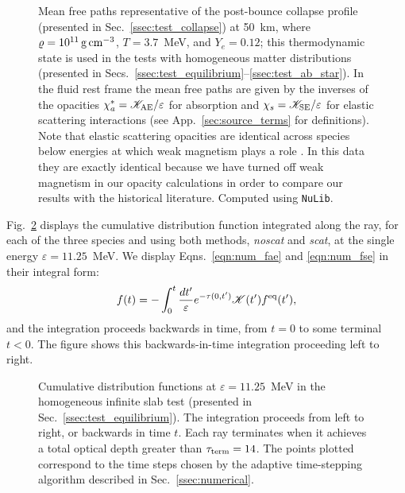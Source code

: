 \documentclass[aps,floatfix,prd,superscriptaddress,twocolumn]{revtex4-1}
\begin{document}
\begin{figure}
  \resizebox{\columnwidth}{!}{}
  \caption{Mean free paths
    representative of the post-bounce collapse profile (presented in
    Sec.~\ref{ssec:test_collapse}) at
    50~km, where $\varrho=10^{11}\,{\rm g}\,{\rm cm}^{-3}$,
    $T=3.7$~MeV, and $Y_e=0.12$; this thermodynamic state is used in
    the tests with homogeneous matter distributions
    (presented in Secs.~\ref{ssec:test_equilibrium}--\ref{ssec:test_ab_star}).
    In the fluid rest frame the mean free paths are given by the inverses of the opacities
    $\chi^*_a=\mathscr{K}_{\rm AE}/\varepsilon$ for absorption and
    $\chi_s=\mathscr{K}_{\rm SE}/\varepsilon$ for elastic scattering interactions
    (see App.~\ref{sec:source_terms} for definitions).
    Note that elastic scattering opacities are identical across species
    below energies at which weak magnetism plays a role \cite{horo2002-weak_mag}.
    In this data they are exactly identical
    because we have turned off weak magnetism in our opacity calculations
    in order to compare our results with the historical literature.
    Computed using \lstinline{NuLib}.
  }
  \label{fig:mfps-50km}
\end{figure}

Fig.~\ref{fig:cumulative_f_homogeneous} displays the cumulative distribution
function integrated along the ray, for each of the three species and using
both methods, \emph{noscat} and \emph{scat}, at the single energy
$\varepsilon=11.25$~MeV. We display
Eqns.~\ref{eqn:num_fae} and \ref{eqn:num_fse} in their integral form:
\begin{equation}
  \label{eqn:cumulative_f}
  f(t)
  = - \int_{0}^t \frac{dt'}{\varepsilon}e^{-\tau(0,t')}
  \mathscr{K}(t')f^{\rm eq}(t'),
\end{equation}
and the integration proceeds backwards in time, from $t=0$
to some terminal $t<0$.
The figure shows this backwards-in-time integration proceeding left to right.

\begin{figure}
  \resizebox{\columnwidth}{!}{}
  \caption{Cumulative distribution functions at $\varepsilon=11.25$~MeV
    in the homogeneous infinite slab test
    (presented in Sec.~\ref{ssec:test_equilibrium}).
    The integration proceeds from left to right, or backwards in time $t$.
    Each ray terminates when it achieves a total optical depth
    greater than $\tau_{\rm term}=14$.
    The points plotted correspond to the time steps chosen by the adaptive
    time-stepping algorithm described in Sec.~\ref{ssec:numerical}.
  }
  \label{fig:cumulative_f_homogeneous}
\end{figure}
\end{document}
